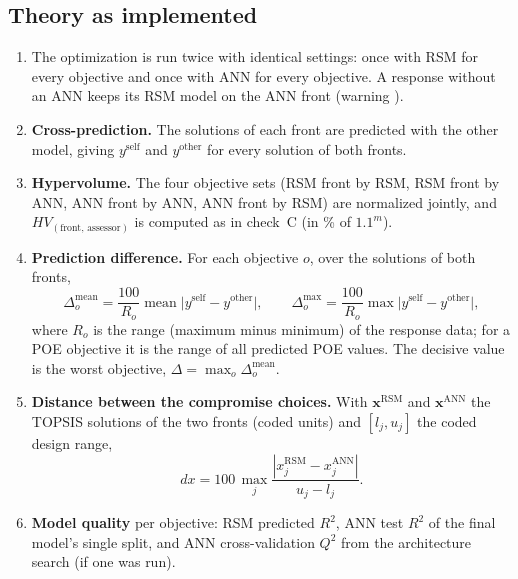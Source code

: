 \subsection{Theory as implemented}
\begin{enumerate}
  \item The optimization is run twice with identical settings: once with RSM for every objective and once with ANN
        for every objective. A response without an ANN keeps its RSM model on the ANN front (warning ).
  \item \textbf{Cross-prediction.} The solutions of each front are predicted with the other model, giving
        $y^\text{self}$ and $y^\text{other}$ for every solution of both fronts.
  \item \textbf{Hypervolume.} The four objective sets (RSM front by RSM, RSM front by ANN, ANN front by ANN, ANN
        front by RSM) are normalized jointly, and $HV_{(\text{front, assessor})}$ is computed as in check~C (in \%
        of $1.1^m$).
  \item \textbf{Prediction difference.} For each objective $o$, over the solutions of both fronts,
        \begin{equation}
        \Delta_o^\text{mean}=\frac{100}{R_o}\operatorname{mean}\bigl|y^\text{self}-y^\text{other}\bigr|,\qquad
        \Delta_o^\text{max}=\frac{100}{R_o}\max\bigl|y^\text{self}-y^\text{other}\bigr|,
        \label{eq:ch08-delta}
        \end{equation}
        where $R_o$ is the range (maximum minus minimum) of the response data; for a POE objective it is the range
        of all predicted POE values. The decisive value is the worst objective,
        $\Delta=\max_o\Delta_o^\text{mean}$.
  \item \textbf{Distance between the compromise choices.} With $\mathbf x^\text{RSM}$ and $\mathbf x^\text{ANN}$ the
        TOPSIS solutions of the two fronts (coded units) and $[l_j,u_j]$ the coded design range,
        \begin{equation}
        dx=100\,\max_j\frac{|x^\text{RSM}_j-x^\text{ANN}_j|}{u_j-l_j}.
        \label{eq:ch08-dx}
        \end{equation}
  \item \textbf{Model quality} per objective: RSM predicted $R^2$, ANN test $R^2$ of the final model's single
        split, and ANN cross-validation $Q^2$ from the architecture search (if one was run).
\end{enumerate}

